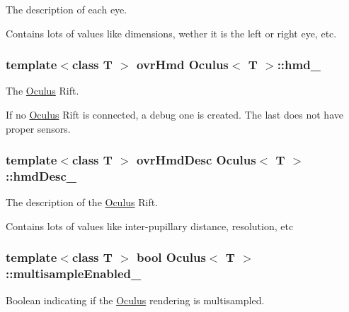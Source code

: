 The description of each eye. 

Contains lots of values like dimensions, wether it is the left or right eye, etc. \hypertarget{classOculus_a27b4553058255871d50e941d67de5374}{}
\subsubsection[{hmd\+\_\+}]{\setlength{\rightskip}{0pt plus 5cm}template$<$class T $>$ ovr\+Hmd {\bf Oculus}$<$ T $>$\+::hmd\+\_\+\hspace{0.3cm}{\ttfamily [protected]}}\label{classOculus_a27b4553058255871d50e941d67de5374}


The \hyperlink{classOculus}{Oculus} Rift. 

If no \hyperlink{classOculus}{Oculus} Rift is connected, a debug one is created. The last does not have proper sensors. \hypertarget{classOculus_aaca119fa80d400cb78ce54b69bc39081}{}
\subsubsection[{hmd\+Desc\+\_\+}]{\setlength{\rightskip}{0pt plus 5cm}template$<$class T $>$ ovr\+Hmd\+Desc {\bf Oculus}$<$ T $>$\+::hmd\+Desc\+\_\+\hspace{0.3cm}{\ttfamily [protected]}}\label{classOculus_aaca119fa80d400cb78ce54b69bc39081}


The description of the \hyperlink{classOculus}{Oculus} Rift. 

Contains lots of values like inter-\/pupillary distance, resolution, etc \hypertarget{classOculus_a526eb65105ddf30005f1a14fd9325e6c}{}
\subsubsection[{multisample\+Enabled\+\_\+}]{\setlength{\rightskip}{0pt plus 5cm}template$<$class T $>$ bool {\bf Oculus}$<$ T $>$\+::multisample\+Enabled\+\_\+\hspace{0.3cm}{\ttfamily [protected]}}\label{classOculus_a526eb65105ddf30005f1a14fd9325e6c}


Boolean indicating if the \hyperlink{classOculus}{Oculus} rendering is multisampled. 


